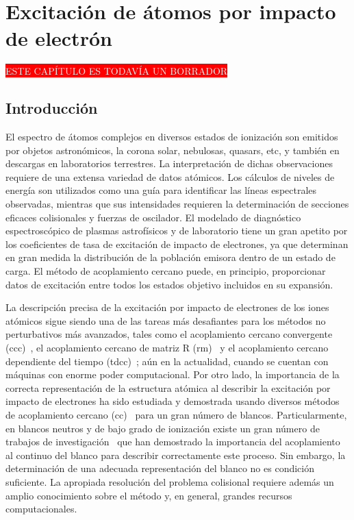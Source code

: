 \chapter{Excitación de átomos por impacto de electrón}
\label{chap:bayeopt}

\begin{center}
\colorbox{red}{\textcolor{white}{ESTE CAPÍTULO ES TODAVÍA UN BORRADOR}}
\end{center}

\section{Introducción}
\label{sec:intro}

El espectro de átomos complejos en diversos estados de ionización son 
emitidos por objetos astronómicos, la corona solar, nebulosas, quasars, 
etc, y también en descargas en laboratorios terrestres. La interpretación
de dichas observaciones requiere de una extensa variedad de datos 
atómicos. Los cálculos de niveles de energía son utilizados como una guía
para identificar las líneas espectrales observadas, mientras que sus 
intensidades requieren la determinación de secciones eficaces 
colisionales y fuerzas de oscilador. 
El modelado de diagnóstico espectroscópico de plasmas astrofísicos y de 
laboratorio tiene un gran apetito por los coeficientes de tasa de 
excitación de impacto de electrones, ya que determinan en gran medida la 
distribución de la población emisora dentro de un estado de carga. El 
método de acoplamiento cercano puede, en principio, proporcionar datos 
de excitación entre todos los estados objetivo incluidos en su expansión.

La descripción precisa de la excitación por impacto de electrones de los 
iones atómicos sigue siendo una de las tareas más desafiantes para los 
métodos no perturbativos más avanzados, tales como el acoplamiento 
cercano convergente (\acs{ccc})~\cite{Bray:92}, el acoplamiento cercano 
de matriz R (\acs{rm})~\cite{Burke:75} y el acoplamiento cercano 
dependiente del tiempo (\acs{tdcc})~\cite{Pindzola:07}; aún en la 
actualidad, cuando se cuentan con máquinas con enorme poder computacional. 
Por otro lado, la importancia de la correcta representación de la 
estructura atómica al describir la excitación por impacto de electrones 
ha sido estudiada y demostrada usando diversos métodos de acoplamiento 
cercano (\acs{cc})~\cite{Bartschat:04,Zatsarinny:16,Be_Ballance:03} para 
un gran número de blancos. Particularmente, en blancos neutros y de bajo 
grado de ionización existe un gran número de trabajos de 
investigación~\cite{Ballance:03,Badnell:03,Mitnik:03} que han demostrado 
la importancia del acoplamiento al continuo del blanco para describir 
correctamente este proceso. Sin embargo, la determinación de una adecuada 
representación del blanco no es condición suficiente. La apropiada 
resolución del problema colisional requiere además un amplio conocimiento 
sobre el método y, en general, grandes recursos computacionales.

